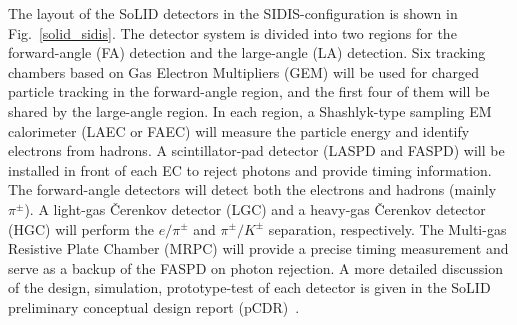 The layout of the SoLID detectors in the SIDIS-configuration is shown in
Fig.~\ref{solid_sidis}. The detector system is divided into two regions for the
forward-angle (FA) detection and the large-angle (LA) detection. Six tracking chambers 
based on Gas Electron Multipliers (GEM) will be used for charged particle
tracking in the forward-angle region, and the first four of them will be shared by the large-angle
region. In each region, a Shashlyk-type sampling EM calorimeter (LAEC or
FAEC) will measure the particle energy and identify electrons from hadrons. A
scintillator-pad detector (LASPD and FASPD) will be installed in front of each
EC to reject photons and provide timing information. The forward-angle
detectors will detect both the electrons and hadrons (mainly $\pi^{\pm}$). A
light-gas \v{C}erenkov detector (LGC) and a heavy-gas \v{C}erenkov detector
(HGC) will perform the $e/\pi^{\pm}$ and $\pi^{\pm}/K^{\pm}$ separation,
respectively. The Multi-gas Resistive Plate Chamber (MRPC) will provide a
precise timing measurement and serve as a backup of the FASPD on photon
rejection. A more detailed discussion of the design, simulation, prototype-test
of each detector is given in the SoLID preliminary conceptual design report
(pCDR)~\cite{solid_pcdr}.

